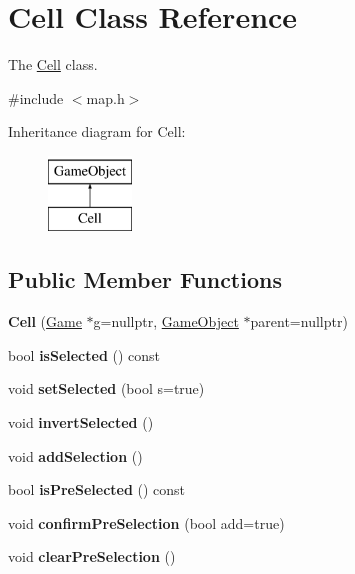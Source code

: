 \hypertarget{class_cell}{}\section{Cell Class Reference}
\label{class_cell}


The \hyperlink{class_cell}{Cell} class.  




{\ttfamily \#include $<$map.\+h$>$}

Inheritance diagram for Cell\+:\begin{figure}[H]
\begin{center}
\leavevmode
\includegraphics[height=2.000000cm]{class_cell}
\end{center}
\end{figure}
\subsection*{Public Member Functions}
\begin{DoxyCompactItemize}
\item 
\hypertarget{class_cell_ad2edfbf561021e72a464888921c0b576}{}\label{class_cell_ad2edfbf561021e72a464888921c0b576} 
{\bfseries Cell} (\hyperlink{class_game}{Game} $\ast$g=nullptr, \hyperlink{class_game_object}{Game\+Object} $\ast$parent=nullptr)
\item 
\hypertarget{class_cell_afa2b60bb5b89e5f370a8a73e3d2f8c8f}{}\label{class_cell_afa2b60bb5b89e5f370a8a73e3d2f8c8f} 
bool {\bfseries is\+Selected} () const
\item 
\hypertarget{class_cell_a40146bbb2b74cf56337462abc4d0327c}{}\label{class_cell_a40146bbb2b74cf56337462abc4d0327c} 
void {\bfseries set\+Selected} (bool s=true)
\item 
\hypertarget{class_cell_ad8310bd5ddbdcb3ab3036356556b32b3}{}\label{class_cell_ad8310bd5ddbdcb3ab3036356556b32b3} 
void {\bfseries invert\+Selected} ()
\item 
\hypertarget{class_cell_a9801c2d435d44834bd14a80fba778618}{}\label{class_cell_a9801c2d435d44834bd14a80fba778618} 
void {\bfseries add\+Selection} ()
\item 
\hypertarget{class_cell_ae355dcd18d0517a1a445965c10f1f0c3}{}\label{class_cell_ae355dcd18d0517a1a445965c10f1f0c3} 
bool {\bfseries is\+Pre\+Selected} () const
\item 
\hypertarget{class_cell_a16f6d41be75c42ad20ad29d0b5725ece}{}\label{class_cell_a16f6d41be75c42ad20ad29d0b5725ece} 
void {\bfseries confirm\+Pre\+Selection} (bool add=true)
\item 
\hypertarget{class_cell_aa0704872b8d4ae7f40022cfebfa48944}{}\label{class_cell_aa0704872b8d4ae7f40022cfebfa48944} 
void {\bfseries clear\+Pre\+Selection} ()
\end{DoxyCompactItemize}
